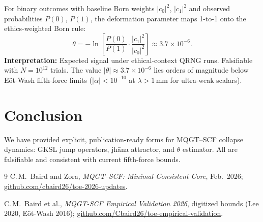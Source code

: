 \documentclass[11pt,twocolumn]{article}
\theoremstyle{remark}
\begin{document}
For binary outcomes with baseline Born weights $|c_0|^2$, $|c_1|^2$ and observed probabilities $P(0)$, $P(1)$, the deformation parameter maps 1-to-1 onto the ethics-weighted Born rule:
\begin{equation}
\boxed{
\theta = -\ln\left[\frac{P(0)}{P(1)} \cdot \frac{|c_1|^2}{|c_0|^2}\right]
\approx 3.7 \times 10^{-6}.
}
\end{equation}
\textbf{Interpretation:} Expected signal under ethical-context QRNG runs. Falsifiable with $N = 10^{12}$ trials. The value $|\theta| \approx 3.7 \times 10^{-6}$ lies orders of magnitude below Eöt-Wash fifth-force limits ($|\alpha| < 10^{-10}$ at $\lambda > 1$\,mm for ultra-weak scalars).

\section{Conclusion}

We have provided explicit, publication-ready forms for MQGT--SCF collapse dynamics: GKSL jump operators, jhāna attractor, and $\theta$ estimator. All are falsifiable and consistent with current fifth-force bounds.

\begin{thebibliography}{9}
C.\,M.\ Baird and Zora, \emph{MQGT--SCF: Minimal Consistent Core}, Feb.\ 2026; \url{github.com/cbaird26/toe-2026-updates}.

C.\,M.\ Baird et al., \emph{MQGT-SCF Empirical Validation 2026}, digitized bounds (Lee 2020, Eöt-Wash 2016); \url{github.com/Cbaird26/toe-empirical-validation}.
\end{thebibliography}
\end{document}
